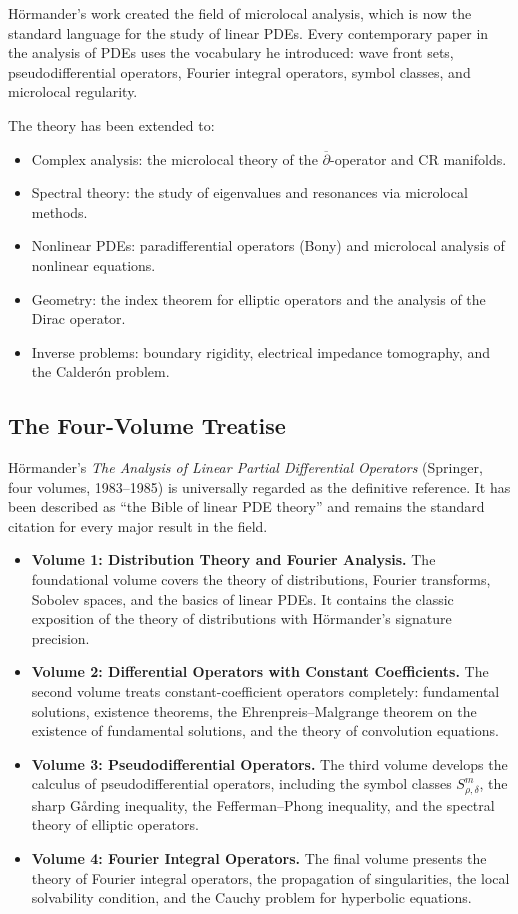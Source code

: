 H\"ormander's work created the field of microlocal analysis, which is
now the standard language for the study of linear PDEs. Every
contemporary paper in the analysis of PDEs uses the vocabulary he
introduced: wave front sets, pseudodifferential operators, Fourier
integral operators, symbol classes, and microlocal regularity.

The theory has been extended to:
\begin{itemize}
    \item Complex analysis: the microlocal theory of the
    \(\overline{\partial}\)-operator and CR manifolds.
    \item Spectral theory: the study of eigenvalues and resonances
    via microlocal methods.
    \item Nonlinear PDEs: paradifferential operators (Bony) and
    microlocal analysis of nonlinear equations.
    \item Geometry: the index theorem for elliptic operators and
    the analysis of the Dirac operator.
    \item Inverse problems: boundary rigidity, electrical impedance
    tomography, and the Calder\'on problem.
\end{itemize}

\subsection{The Four-Volume Treatise}

H\"ormander's \textit{The Analysis of Linear Partial Differential
Operators} (Springer, four volumes, 1983--1985) is universally
regarded as the definitive reference. It has been described as
``the Bible of linear PDE theory'' and remains the standard citation
for every major result in the field.

\begin{itemize}
    \item \textbf{Volume 1: Distribution Theory and Fourier Analysis.}
    The foundational volume covers the theory of distributions,
    Fourier transforms, Sobolev spaces, and the basics of linear PDEs.
    It contains the classic exposition of the theory of distributions
    with H\"ormander's signature precision.
    \item \textbf{Volume 2: Differential Operators with Constant
    Coefficients.} The second volume treats constant-coefficient
    operators completely: fundamental solutions, existence theorems,
    the Ehrenpreis--Malgrange theorem on the existence of fundamental
    solutions, and the theory of convolution equations.
    \item \textbf{Volume 3: Pseudodifferential Operators.} The third
    volume develops the calculus of pseudodifferential operators,
    including the symbol classes \(S^m_{\rho,\delta}\), the sharp
    G\r{a}rding inequality, the Fefferman--Phong inequality, and the
    spectral theory of elliptic operators.
    \item \textbf{Volume 4: Fourier Integral Operators.} The final
    volume presents the theory of Fourier integral operators, the
    propagation of singularities, the local solvability condition,
    and the Cauchy problem for hyperbolic equations.
\end{itemize}

